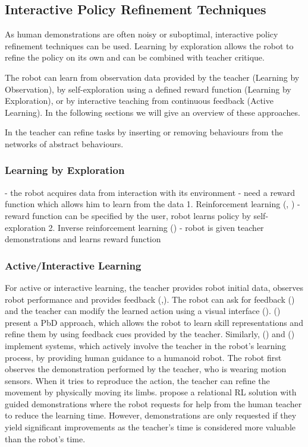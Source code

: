 \subsection{Interactive Policy Refinement Techniques}\label{subsec:Other RP Methods}
As human demonstrations are often noisy or suboptimal, interactive policy refinement techniques can be used.
Learning by exploration allows the robot to refine the policy on its own and can be combined with  teacher critique. 

The robot can learn from observation data provided by the teacher (Learning by Observation), by self-exploration using a defined reward function (Learning by Exploration), or by interactive teaching from continuous feedback (Active Learning). In the following sections we will give an overview of these approaches.

In \cite{nicolescu2003natural} the teacher can refine tasks by inserting or removing behaviours from the networks of abstract behaviours.

\subsubsection{Learning by Exploration}\label{sssec:LbExploration}

- the robot acquires data from interaction with its environment
- need a reward function which allows him to learn from the data
1. Reinforcement learning (\cite{sutton1998reinforcement}, \cite{mnih2015human})
 - reward function can be specified by the user, robot learns policy by self-exploration
 2. Inverse reinforcement learning (\cite{abbeel2004apprenticeship})
 - robot is given teacher demonstrations and learns reward function

\subsubsection{Active/Interactive Learning}\label{sssec:Active Learning} 
For active or interactive learning, the teacher provides robot initial data, observes robot performance and provides feedback (\cite{chernova2014robot},\cite{calinon2007active}).
The robot can ask for feedback (\cite{cakmak2012aaai}) and the teacher can modify the learned action using a visual interface (\cite{alexandrova2015roboflow}).
(\cite{nicolescu2003natural}) present a PbD approach, which allows the robot to learn skill representations and refine them by using feedback cues provided by the teacher.
Similarly, (\cite{calinon2007active}) and (\cite{calinon2007incremental}) implement systems, which actively involve the teacher in the robot's learning process, by providing human guidance to a humanoid robot. 
The robot first observes the demonstration performed by the teacher, who is wearing motion sensors. When it tries to reproduce the action, the teacher can refine the movement by physically moving its limbs.
\cite{martinez2017relational} propose a relational RL solution with guided demonstrations where the robot requests for help from the human teacher to reduce the learning time.
However, demonstrations are only requested if they yield significant improvements as the teacher's time is considered more valuable than the robot's time.

